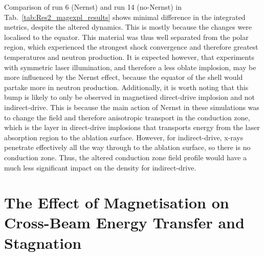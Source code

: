 Comparison of run 6 (Nernst) and run 14 (no-Nernst) in Tab.~\ref{tab:Res2_magexpl_results} shows minimal difference in the integrated metrics, despite the altered dynamics.
This is mostly because the changes were localised to the equator.
This material was thus well separated from the polar region, which experienced the strongest shock convergence and therefore greatest temperatures and neutron production.
It is expected however, that experiments with symmetric laser illumination, and therefore a less oblate implosion, may be more influenced by the Nernst effect, because the equator of the shell would partake more in neutron production.
Additionally, it is worth noting that this bump is likely to only be observed in magnetised direct-drive implosion and not indirect-drive.
This is because the main action of Nernst in these simulations was to change the field and therefore anisotropic transport in the conduction zone, which is the layer in direct-drive implosions that transports energy from the laser absorption region to the ablation surface.
However, for indirect-drive, x-rays penetrate effectively all the way through to the ablation surface, so there is no conduction zone.
Thus, the altered conduction zone field profile would have a much less significant impact on the density for indirect-drive.

\section{The Effect of Magnetisation on Cross-Beam Energy Transfer and Stagnation}%
\label{sec:Res2_mag_on_CBET}

